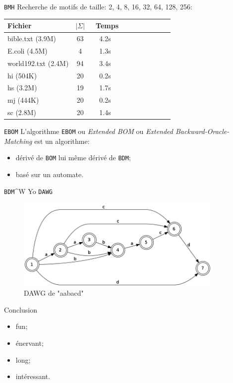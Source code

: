 \documentclass[handout]{beamer}
\begin{document}
\begin{frame}{\texttt{BMH}}
  Recherche de motifs de taille: 2, 4, 8, 16, 32, 64, 128, 256:
  
  \begin{tabular}{|l|c|c|c|c|c|c|c|c|c|}
    \hline
    Fichier             & $ | \Sigma | $ & ~Temps \\
    \hline

    bible.txt (3.9M)    & 63 & 4.2s \\    
    E.coli (4.5M)       & 4  & 1.3s \\
    world192.txt (2.4M) & 94 & 3.4s \\
    hi (504K)           & 20 & 0.2s \\
    hs (3.2M)           & 19 & 1.7s \\
    mj (444K)           & 20 & 0.2s \\
    sc (2.8M)           & 20 & 1.4s \\
    \hline

  \end{tabular}
\end{frame}

\begin{frame}{\texttt{EBOM}}
  L'algorithme \texttt{EBOM} ou \emph{Extended BOM} ou \emph{Extended Backward-Oracle-Matching} est un algorithme:
  \begin{itemize}
  \item dérivé de \texttt{BOM} lui même dérivé de \texttt{BDM};
  \item basé sur un automate.
  \end{itemize}
\end{frame}

\begin{frame}{\texttt{BDM}\^{}W Yo \texttt{DAWG}}
  \begin{figure}[h]
    \centering
    \includegraphics[width=10cm]{dawg.png}
    \caption{DAWG de "aabacd"}
    \label{fig:dawg}
  \end{figure}
\end{frame}

\begin{frame}{Conclusion}
  \begin{itemize}
  \item fun;
  \item énervant;
  \item long;
  \item intéressant.
  \end{itemize}
\end{frame}
\end{document}
